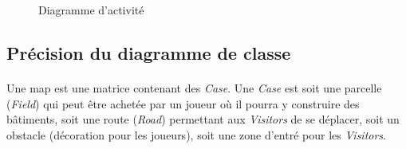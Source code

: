 \documentclass[a4paper,11pt]{report}
\begin{document}
\begin{figure}[ht]
    \caption{Diagramme d'activité}
\end{figure}

\newpage
\subsection{Précision du diagramme de classe}
\paragraph{}
Une map est une matrice contenant des \textit{Case}. Une \textit{Case} est soit une parcelle (\textit{Field}) qui peut être achetée par un joueur où il pourra y construire des bâtiments, soit une route (\textit{Road}) permettant aux \textit{Visitors} de se déplacer, soit un obstacle (décoration  pour les joueurs), soit une zone d'entré pour les \textit{Visitors}. 

\newpage

\printindex
\end{document}
